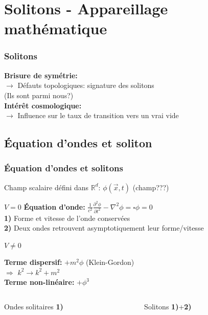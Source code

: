 \documentclass[handout]{beamer}
\begin{document}
\section{Solitons - Appareillage mathématique }

\begin{frame}\frametitle{Solitons}
\textbf{Brisure de symétrie:} \\$\rightarrow$
Défauts topologiques: signature des solitons\\
(Ils sont parmi nous?)\\[1 cm]

\textbf{Intérêt cosmologique:} 
\\$\rightarrow$ Influence sur le taux de transition vers un vrai vide
      
\end{frame}

\subsection{Équation d'ondes et soliton}
\begin{frame}\frametitle{Équation d'ondes et solitons}
Champ scalaire défini dans $\mathbb{R}^d$: $\phi(\vec{x},t)$ (champ???)
\begin{block}{$V=0$}
\textbf{
Équation d'onde:} $\frac{1}{c^2}\frac{\partial^2 \phi}{\partial t^2} - \nabla^2 \phi = \square \phi = 0 $\\[0.25 cm]
\textbf{1)} Forme et vitesse de l'onde conservées
\\\textbf{2)} Deux ondes retrouvent asymptotiquement leur forme/vitesse\\[0.25 cm]
\end{block}



\begin{exampleblock}{$V \neq 0$}

    \textbf{Terme dispersif:} $+m^2\phi$ (Klein-Gordon) 
    \\$\Rightarrow$ $k^2 \rightarrow k^2+m^2$ \\

    \textbf{Terme non-linéaire:} $+\phi^3$\\[0.25 cm]
\begin{columns}[T]
    \begin{column}[T]{.35\linewidth}
    Ondes solitaires \textbf{1)}
    \end{column}
    \begin{column}[T]{.5\linewidth}
    Solitons \textbf{1)}+\textbf{2)} 
    \end{column}
  \end{columns}

\end{exampleblock}




\end{frame}
\end{document}
